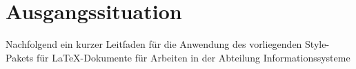 \chapter{Ausgangssituation} 
Nachfolgend ein kurzer Leitfaden f\"{u}r die Anwendung des
vorliegenden Style-Pakets f\"{u}r LaTeX-Dokumente f\"{u}r Arbeiten in der
Abteilung Informationssysteme